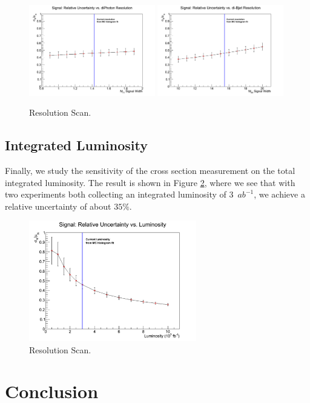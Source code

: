 \documentclass{cmspaper}
\begin{document}
\begin{figure}[h]
  \centering
  \includegraphics[width=0.49\textwidth]{figures/XSUncertaintyVsPhotonResolution.pdf}
  \includegraphics[width=0.49\textwidth]{figures/XSUncertaintyVsJetEnergyResolution.pdf}
  \caption{Resolution Scan.}
  \label{fig:ResolutionScan}
\end{figure}


\subsection{Integrated Luminosity}

Finally, we study the sensitivity of the cross section measurement on the total
integrated luminosity. The result is shown in Figure \ref{fig:ResolutionScan},
where we see that with two experiments both collecting an integrated luminosity
of $3$~$ab^{-1}$, we achieve a relative uncertainty of about $35\%$.

\begin{figure}[h]
  \centering
  \includegraphics[width=0.65\textwidth]{figures/XSUncertaintyVsLumi.pdf}
  \caption{Resolution Scan.}
  \label{fig:ResolutionScan}
\end{figure}

\section{Conclusion}
\label{sec:conclusion}




%

\appendix
\appendixpage
\end{document}
